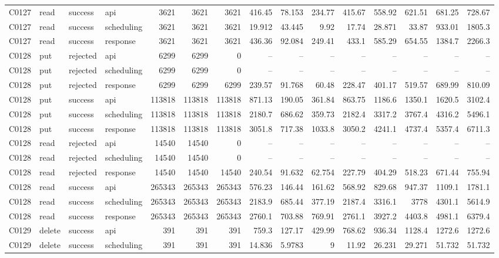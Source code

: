 \begin{landscape}
\begin{longtable}{llllrrrrrrrrrrr}
C0127 & read & success & api & 3621 & 3621 & 3621 & 416.45 & 78.153 & 234.77 & 415.67 & 558.92 & 621.51 & 681.25 & 728.67\\
C0127 & read & success & scheduling & 3621 & 3621 & 3621 & 19.912 & 43.445 & 9.92 & 17.74 & 28.871 & 33.87 & 933.01 & 1805.3\\
C0127 & read & success & response & 3621 & 3621 & 3621 & 436.36 & 92.084 & 249.41 & 433.1 & 585.29 & 654.55 & 1384.7 & 2266.3\\
C0128 & put & rejected & api & 6299 & 6299 & 0 & -- & -- & -- & -- & -- & -- & -- & --\\
C0128 & put & rejected & scheduling & 6299 & 6299 & 0 & -- & -- & -- & -- & -- & -- & -- & --\\
C0128 & put & rejected & response & 6299 & 6299 & 6299 & 239.57 & 91.768 & 60.48 & 228.47 & 401.17 & 519.57 & 689.99 & 810.09\\
C0128 & put & success & api & 113818 & 113818 & 113818 & 871.13 & 190.05 & 361.84 & 863.75 & 1186.6 & 1350.1 & 1620.5 & 3102.4\\
C0128 & put & success & scheduling & 113818 & 113818 & 113818 & 2180.7 & 686.62 & 359.73 & 2182.4 & 3317.2 & 3767.4 & 4316.2 & 5496.1\\
C0128 & put & success & response & 113818 & 113818 & 113818 & 3051.8 & 717.38 & 1033.8 & 3050.2 & 4241.1 & 4737.4 & 5357.4 & 6711.3\\
C0128 & read & rejected & api & 14540 & 14540 & 0 & -- & -- & -- & -- & -- & -- & -- & --\\
C0128 & read & rejected & scheduling & 14540 & 14540 & 0 & -- & -- & -- & -- & -- & -- & -- & --\\
C0128 & read & rejected & response & 14540 & 14540 & 14540 & 240.54 & 91.632 & 62.754 & 227.79 & 404.29 & 518.23 & 671.44 & 755.94\\
C0128 & read & success & api & 265343 & 265343 & 265343 & 576.23 & 146.44 & 161.62 & 568.92 & 829.68 & 947.37 & 1109.1 & 1781.1\\
C0128 & read & success & scheduling & 265343 & 265343 & 265343 & 2183.9 & 685.44 & 377.19 & 2187.4 & 3316.1 & 3778 & 4301.1 & 5614.9\\
C0128 & read & success & response & 265343 & 265343 & 265343 & 2760.1 & 703.88 & 769.91 & 2761.1 & 3927.2 & 4403.8 & 4981.1 & 6379.4\\
C0129 & delete & success & api & 391 & 391 & 391 & 759.3 & 127.17 & 429.99 & 768.62 & 936.34 & 1128.4 & 1272.6 & 1272.6\\
C0129 & delete & success & scheduling & 391 & 391 & 391 & 14.836 & 5.9783 & 9 & 11.92 & 26.231 & 29.271 & 51.732 & 51.732\\

\end{longtable}
\end{landscape}
